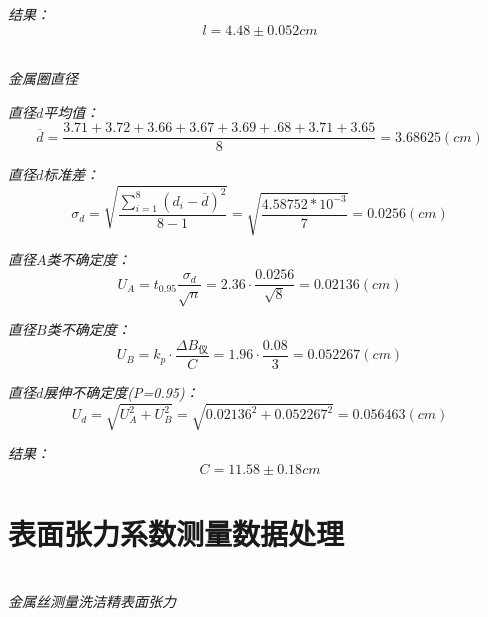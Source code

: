 \documentclass[UTF8]{ctexart}
\begin{document}
        \emph{结果：}
        \begin{equation}
            l=4.48±0.052cm 
        \end{equation}
    


    \begin{center}
        \emph{\\[0.01cm]金属圈直径}
    \end{center}

    \emph{直径$d$平均值：}
    \begin{equation*}
        \overline{d}=\frac{3.71+	3.72+	3.66	+3.67+	3.69	+.68+	3.71+	3.65}{8} =3.68625(cm)
    \end{equation*}

    \emph{直径$d$标准差：}
    \begin{equation*}
        \sigma _d=\sqrt{\frac{\sum_{i=1}^8(d_i-\overline{d})^2}{8-1}}=\sqrt{\frac{4.58752*10^{-3}}{7}}=0.0256(cm)
    \end{equation*}

    \emph{直径$A$类不确定度：}
    \begin{equation*}
        U_A=t_{0.95}\frac{\sigma_d}{\sqrt{n}}=2.36·\frac{0.0256}{\sqrt{8}}=0.02136(cm)
    \end{equation*}

    \emph{直径$B$类不确定度：}
    \begin{equation*}
        U_B=k_p·\frac{\varDelta B_仪}{C}=1.96·\frac{0.08}{3}=0.052267(cm)
    \end{equation*}

    \emph{直径$d$展伸不确定度(P=0.95)：}
    \begin{equation*}
       U_{d}=\sqrt{U_A^2+U_B^2}= \sqrt{0.02136^2+0.052267^2}=0.056463(cm)
    \end{equation*}

    \emph{结果：}
    \begin{equation}
        C=11.58±0.18cm 
    \end{equation}


    \section{表面张力系数测量数据处理}

    \begin{center}
        \emph{\\[0.01cm]金属丝测量洗洁精表面张力}
    \end{center}
\end{document}
